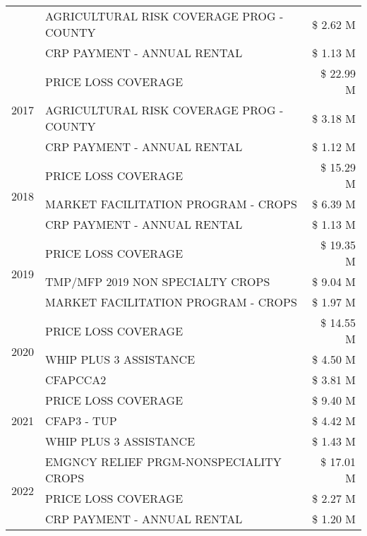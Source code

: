 \begin{tabular}{llr}
 & AGRICULTURAL RISK COVERAGE PROG - COUNTY & \$ 2.62 M \\
 & CRP PAYMENT - ANNUAL RENTAL & \$ 1.13 M \\
\cline{1-3}
\multirow[t]{3}{*}{2017} & PRICE LOSS COVERAGE & \$ 22.99 M \\
 & AGRICULTURAL RISK COVERAGE PROG - COUNTY & \$ 3.18 M \\
 & CRP PAYMENT - ANNUAL RENTAL & \$ 1.12 M \\
\cline{1-3}
\multirow[t]{3}{*}{2018} & PRICE LOSS COVERAGE & \$ 15.29 M \\
 & MARKET FACILITATION PROGRAM - CROPS & \$ 6.39 M \\
 & CRP PAYMENT - ANNUAL RENTAL & \$ 1.13 M \\
\cline{1-3}
\multirow[t]{3}{*}{2019} & PRICE LOSS COVERAGE & \$ 19.35 M \\
 & TMP/MFP 2019 NON SPECIALTY CROPS & \$ 9.04 M \\
 & MARKET FACILITATION PROGRAM - CROPS & \$ 1.97 M \\
\cline{1-3}
\multirow[t]{3}{*}{2020} & PRICE LOSS COVERAGE & \$ 14.55 M \\
 & WHIP PLUS 3 ASSISTANCE & \$ 4.50 M \\
 & CFAPCCA2 & \$ 3.81 M \\
\cline{1-3}
\multirow[t]{3}{*}{2021} & PRICE LOSS COVERAGE & \$ 9.40 M \\
 & CFAP3 - TUP & \$ 4.42 M \\
 & WHIP PLUS 3 ASSISTANCE & \$ 1.43 M \\
\cline{1-3}
\multirow[t]{3}{*}{2022} & EMGNCY RELIEF PRGM-NONSPECIALITY CROPS & \$ 17.01 M \\
 & PRICE LOSS COVERAGE & \$ 2.27 M \\
 & CRP PAYMENT - ANNUAL RENTAL & \$ 1.20 M \\
\cline{1-3}
\bottomrule
\end{tabular}
